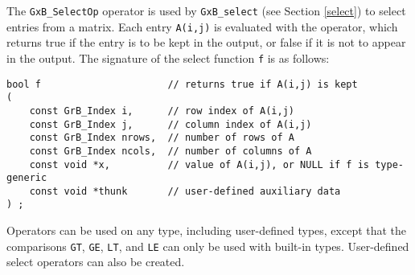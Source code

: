 \documentclass[12pt]{article}
\begin{document}
The \verb'GxB_SelectOp' operator is used by \verb'GxB_select' (see Section
\ref{select}) to select entries from a matrix.  Each entry \verb'A(i,j)' is
evaluated with the operator, which returns true if the entry is to be kept in
the output, or false if it is not to appear in the output.  The signature of
the select function \verb'f' is as follows:

{\footnotesize
\begin{verbatim}
bool f                      // returns true if A(i,j) is kept
(
    const GrB_Index i,      // row index of A(i,j)
    const GrB_Index j,      // column index of A(i,j)
    const GrB_Index nrows,  // number of rows of A
    const GrB_Index ncols,  // number of columns of A
    const void *x,          // value of A(i,j), or NULL if f is type-generic
    const void *thunk       // user-defined auxiliary data
) ; \end{verbatim}}

Operators can be used on any type, including user-defined types, except that
the comparisons \verb'GT', \verb'GE', \verb'LT', and \verb'LE' can only be used
with built-in types.  User-defined select operators can also be created.
\end{document}
